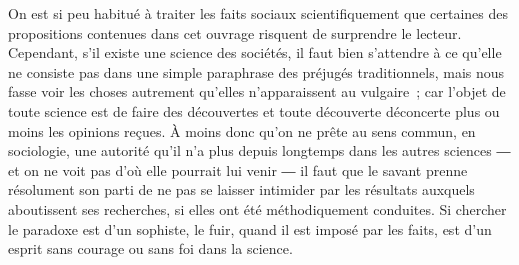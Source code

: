 \documentclass[french,twoside]{book} %
\begin{document}
\noindent On est si peu habitué à traiter les faits sociaux scientifiquement que certaines des propositions contenues dans cet ouvrage risquent de surprendre le lecteur. Cependant, s’il existe une science des sociétés, il faut bien s’attendre à ce qu’elle ne consiste pas dans une simple paraphrase des préjugés traditionnels, mais nous fasse voir les choses autrement qu’elles n’apparaissent au vulgaire ; car l’objet de toute science est de faire des découvertes et toute découverte déconcerte plus ou moins les opinions reçues. À moins donc qu’on ne prête au sens commun, en sociologie, une autorité qu’il n’a plus depuis longtemps dans les autres sciences ― et on ne voit pas d’où elle pourrait lui venir ― il faut que le savant prenne résolument son parti de ne pas se laisser intimider par les résultats auxquels aboutissent ses recherches, si elles ont été méthodiquement conduites. Si chercher le paradoxe est d’un sophiste, le fuir, quand il est imposé par les faits, est d’un esprit sans courage ou sans foi dans la science.\par
\end{document}
